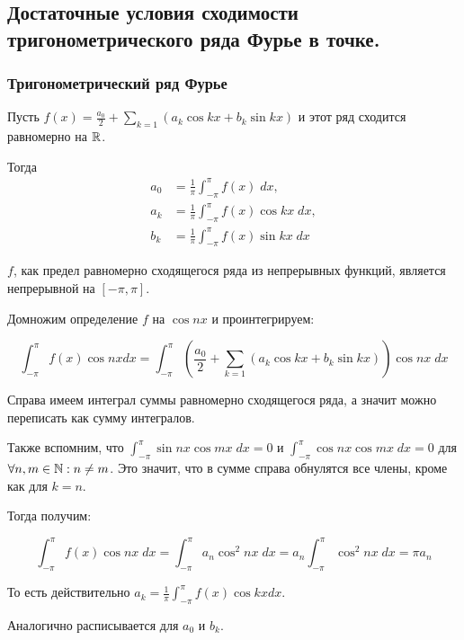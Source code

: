 \subsection{Достаточные условия сходимости тригонометрического ряда Фурье в точке.}

\subsubsection{Тригонометрический ряд Фурье}

\Lemma Пусть $f(x) = \frac{a_0}{2} + \sum_{k=1} \left(a_k \cos kx + b_k \sin kx\right)$ и этот ряд сходится равномерно на $\mathbb{R}$.

Тогда
\begin{align*}
    a_0 &= \frac{1}{\pi} \int_{-\pi}^{\pi} f(x) \;dx, \\
    a_k &= \frac{1}{\pi} \int_{-\pi}^{\pi} f(x) \cos kx \;dx, \\
    b_k &= \frac{1}{\pi} \int_{-\pi}^{\pi} f(x) \sin kx \;dx
\end{align*}

\Proof

$f$, как предел равномерно сходящегося ряда из непрерывных функций, является непрерывной на $[-\pi, \pi]$.

Домножим определение $f$ на $\cos nx$ и проинтегрируем:

\begin{equation*}
    \int_{-\pi}^{\pi} f(x) \cos nx dx = \int_{-\pi}^{\pi} \left(\frac{a_0}{2} + \sum_{k=1} \left(a_k \cos kx + b_k \sin kx\right)\right) \cos nx \; dx
\end{equation*}

Справа имеем интеграл суммы равномерно сходящегося ряда, а значит можно переписать как сумму интегралов.

Также вспомним, что $\int_{-\pi}^{\pi} \sin nx \cos mx \;dx = 0$ и $\int_{-\pi}^{\pi} \cos nx \cos mx \;dx = 0$ для $\forall n, m \in \mathbb{N}: n \neq m$.
Это значит, что в сумме справа обнулятся все члены, кроме как для $k=n$.

Тогда получим:

\begin{equation*}
    \int_{-\pi}^{\pi} f(x) \cos nx \;dx = \int_{-\pi}^{\pi} a_n \cos^2 nx \; dx =  a_n \int_{-\pi}^{\pi} \cos^2 nx \; dx = \pi a_n
\end{equation*}

То есть действительно $a_k = \frac{1}{\pi} \int_{-\pi}^{\pi} f(x) \cos kx dx$.

Аналогично расписывается для $a_0$ и $b_k$.


